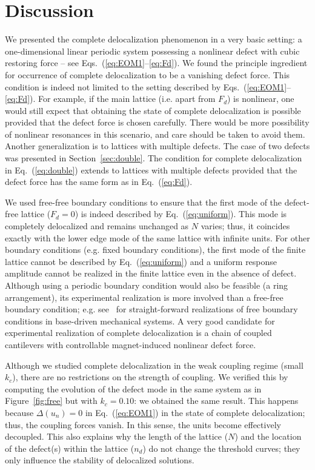 \documentclass[aps,pre,twocolumn,groupedaddress]{revtex4-1}
\begin{document}
\section{Discussion}
\label{sec:discussion}

We presented the complete delocalization phenomenon in a very basic setting: a one-dimensional linear periodic system possessing a nonlinear defect with cubic restoring force -- see Eqs.~(\ref{eq:EOM1}--\ref{eq:Fd}). We found the principle ingredient for occurrence of complete delocalization to be a vanishing defect force. This condition is indeed not limited to the setting described by Eqs.~(\ref{eq:EOM1}--\ref{eq:Fd}). For example, if the main lattice (i.e. apart from $F_d$) is nonlinear, one would still expect that obtaining the state of complete delocalization is possible provided that the defect force is chosen carefully. There would be more possibility of nonlinear resonances in this scenario, and care should be taken to avoid them. Another generalization is to lattices with multiple defects. The case of two defects was presented in Section~\ref{sec:double}. The condition for complete delocalization in Eq.~(\ref{eq:double}) extends to lattices with multiple defects provided that the defect force has the same form as in Eq.~(\ref{eq:Fd}). 

We used free-free boundary conditions to ensure that the first mode of the defect-free lattice ($F_d=0$) is indeed described by Eq.~(\ref{eq:uniform}). This mode is completely delocalized and remains unchanged as $N$ varies; thus, it coincides exactly with the lower edge mode of the same lattice with infinite units. For other boundary conditions (e.g. fixed boundary conditions), the first mode of the finite lattice cannot be described by Eq.~(\ref{eq:uniform}) and a uniform response amplitude cannot be realized in the finite lattice even in the absence of defect. Although using a periodic boundary condition would also be feasible (a ring arrangement), its experimental realization is more involved than a free-free boundary condition; e.g. see~\cite{EnglishCuevas,JSV1} for straight-forward realizations of free boundary conditions in base-driven mechanical systems. A very good candidate for experimental realization of complete delocalization is a chain of coupled cantilevers with controllable magnet-induced nonlinear defect force. %

Although we studied complete delocalization in the weak coupling regime (small $k_c$), there are no restrictions on the strength of coupling. We verified this by computing the evolution of the defect mode in the same system as in Figure~\ref{fig:free} but with $k_c=0.10$: we obtained the same result. This happens because $\Delta(u_n)=0$ in Eq.~(\ref{eq:EOM1}) in the state of complete delocalization; thus, the coupling forces vanish. In this sense, the units become effectively decoupled. This also explains why the length of the lattice ($N$) and the location of the defect(s) within the lattice ($n_d$) do not change the threshold curves; they only influence the stability of delocalized solutions. 
\end{document}

